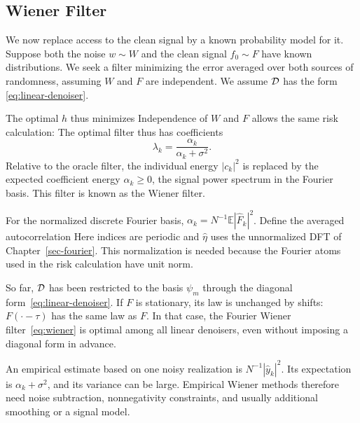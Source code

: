 \subsection{Wiener Filter}

We now replace access to the clean signal by a known probability model for it.
%
Suppose both the noise $w \sim W$ and the clean signal $f_0 \sim F$ have known distributions. We seek a filter minimizing the error averaged over both sources of randomness, assuming $W$ and $F$ are independent.
%
We assume $\mathcal{D}$ has the form \eqref{eq:linear-denoiser}. 


The optimal $h$ thus minimizes
Independence of $W$ and $F$ allows the same risk calculation:
The optimal filter thus has coefficients
\begin{equation}\label{eq:wiener}
	\lambda_k=\frac{\alpha_k}{\alpha_k+\sigma^2}.
\end{equation}
Relative to the oracle filter, the individual energy $|c_k|^2$ is replaced by the expected coefficient energy $\alpha_k\geq0$, the signal power spectrum in the Fourier basis.
%
This filter is known as the Wiener filter.

For the normalized discrete Fourier basis, $\alpha_k=N^{-1}\mathbb E|\hat F_k|^2$. Define the averaged autocorrelation
Here indices are periodic and $\hat\eta$ uses the unnormalized DFT of Chapter~\ref{sec-fourier}. This normalization is needed because the Fourier atoms used in the risk calculation have unit norm.

So far, $\mathcal{D}$ has been restricted to the basis $\psi_m$ through the diagonal form~\eqref{eq:linear-denoiser}. If $F$ is stationary, its law is unchanged by shifts: $F(\cdot-\tau)$ has the same law as $F$. In that case, the Fourier Wiener filter~\eqref{eq:wiener} is optimal among all linear denoisers, even without imposing a diagonal form in advance.

An empirical estimate based on one noisy realization is $N^{-1}|\hat y_k|^2$. Its expectation is $\alpha_k+\sigma^2$, and its variance can be large. Empirical Wiener methods therefore need noise subtraction, nonnegativity constraints, and usually additional smoothing or a signal model.

